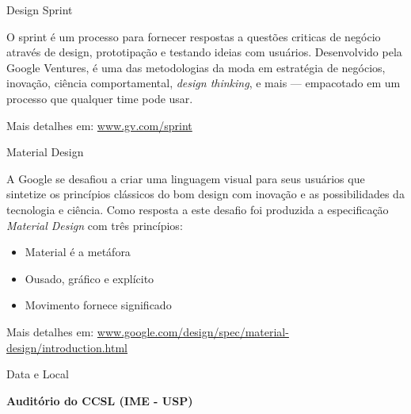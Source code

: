 \documentclass[final]{beamer} %
\begin{document}
\begin{frame}{}
  \vfill
  \noindent
  \begin{centering}
    \begin{minipage}[t][20em][t]{.48\textwidth}
      \begin{block}{\centering \huge Design Sprint}
        \begin{large}
          O sprint é um processo para fornecer respostas a questões criticas de negócio através de design, prototipação e
          testando ideias com usuários. Desenvolvido pela Google Ventures, é uma das metodologias da moda em estratégia de
          negócios, inovação, ciência comportamental, \textit{design thinking}, e mais — empacotado em um processo que
          qualquer time pode usar.

          \vspace{1em}
          Mais detalhes em: \url{www.gv.com/sprint}
          \vspace{3em}
        \end{large}
      \end{block}
    \end{minipage}\hfill%
    \begin{minipage}[t][20em][t]{.48\textwidth}
      \begin{block}{\centering \huge Material Design}
        \begin{large}
          A Google se desafiou a criar uma linguagem visual para seus usuários que sintetize os princípios clássicos do bom
          design com inovação e as possibilidades da tecnologia e ciência. Como resposta a este desafio foi produzida a
          especificação \textit{Material Design} com três princípios:

          \begin{itemize}
            \item Material é a metáfora
            \item Ousado, gráfico e explícito
            \item Movimento fornece significado
          \end{itemize}

          Mais detalhes em: \url{www.google.com/design/spec/material-design/introduction.html}
        \end{large}
      \end{block}
    \end{minipage}
  \end{centering}

  \vfill
  \noindent
  \begin{centering}%
    \begin{minipage}[t][13em][t]{.3\textwidth}
      \begin{block}{\centering \large Data e Local}
        \begin{center}
          \textbf{Auditório do CCSL (IME - USP)}
        \end{center}


\end{block}
\end{minipage}
\end{centering}
\end{frame}
\end{document}
